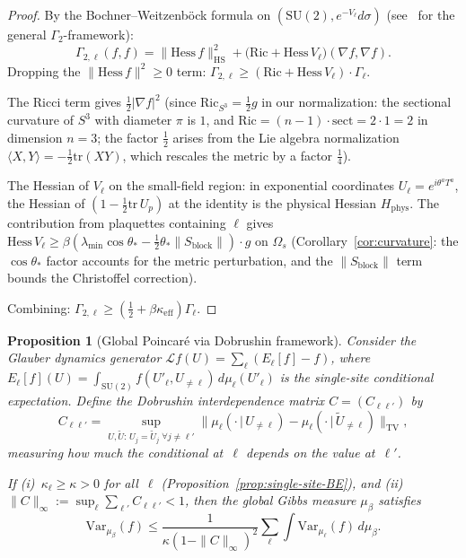 \documentclass[11pt]{article}
\newtheorem{proposition}[theorem]{Proposition}
\theoremstyle{definition}
\newcommand{\SU}{\mathrm{SU}}
\newcommand{\tr}{\mathrm{tr}}
\begin{document}
\begin{proof}
By the Bochner--Weitzenb\"ock formula on
$(\SU(2),e^{-V_\ell}d\sigma)$
(see~\cite{BakryEmery} for the general
$\Gamma_2$-framework):
\begin{equation}
\Gamma_{2,\ell}(f,f)
=\|\mathrm{Hess}\,f\|_{\mathrm{HS}}^2
+\bigl(\mathrm{Ric}+\mathrm{Hess}\,V_\ell\bigr)
(\nabla f,\nabla f).
\end{equation}
Dropping the $\|\mathrm{Hess}\,f\|^2\ge 0$ term:
$\Gamma_{2,\ell}\ge(\mathrm{Ric}+\mathrm{Hess}\,V_\ell)\cdot\Gamma_\ell$.

The Ricci term gives $\frac{1}{2}|\nabla f|^2$ (since
$\mathrm{Ric}_{S^3}=\frac{1}{2}g$ in our normalization: the
sectional curvature of $S^3$ with diameter $\pi$ is $1$, and
$\mathrm{Ric}=(n-1)\cdot\mathrm{sect}=2\cdot 1=2$ in dimension $n=3$;
the factor $\frac{1}{2}$ arises from the Lie algebra normalization
$\langle X,Y\rangle=-\frac{1}{2}\tr(XY)$, which rescales the metric
by a factor $\frac{1}{4}$).

The Hessian of $V_\ell$ on the small-field region: in exponential
coordinates $U_\ell=e^{i\theta^a T^a}$, the Hessian of
$(1-\frac{1}{2}\tr\,U_p)$ at the identity is the physical Hessian
$H_{\mathrm{phys}}$.  The contribution from plaquettes containing
$\ell$ gives
$\mathrm{Hess}\,V_\ell\ge\beta(\lambda_{\min}\cos\theta_*
-\frac{1}{2}\theta_*\|S_{\mathrm{block}}\|)\cdot g$
on $\Omega_s$
(Corollary~\ref{cor:curvature}: the $\cos\theta_*$ factor accounts
for the metric perturbation, and the $\|S_{\mathrm{block}}\|$ term
bounds the Christoffel correction).

Combining: $\Gamma_{2,\ell}\ge(\frac{1}{2}+\beta\kappa_{\mathrm{eff}})\Gamma_\ell$.
\end{proof}

\begin{proposition}[Global Poincar\'e via Dobrushin framework]%
\label{prop:global-poincare}
Consider the Glauber dynamics generator
$\mathcal{L}f(U)=\sum_\ell(E_\ell[f]-f)$,
where $E_\ell[f](U)=\int_{\SU(2)}f(U'_\ell,U_{\neq\ell})\,
d\mu_\ell(U'_\ell)$ is the single-site conditional expectation.
Define the \emph{Dobrushin interdependence matrix}
$C=(C_{\ell\ell'})$ by
\begin{equation}\label{eq:dobrushin}
C_{\ell\ell'}=\sup_{U,\tilde{U}:\,U_j=\tilde{U}_j\;\forall j\ne\ell'}
\|\mu_\ell(\cdot\,|\,U_{\neq\ell})
-\mu_\ell(\cdot\,|\,\tilde{U}_{\neq\ell})\|_{\mathrm{TV}},
\end{equation}
measuring how much the conditional at~$\ell$ depends on the
value at~$\ell'$.

If (i)~$\kappa_\ell\ge\kappa>0$ for all~$\ell$
(Proposition~\ref{prop:single-site-BE}),
and (ii)~$\|C\|_\infty:=\sup_\ell\sum_{\ell'}C_{\ell\ell'}<1$,
then the global Gibbs measure $\mu_\beta$ satisfies
\begin{equation}\label{eq:global-poincare}
\mathrm{Var}_{\mu_\beta}(f)
\le\frac{1}{\kappa(1-\|C\|_\infty)^2}
\sum_\ell\int\mathrm{Var}_{\mu_\ell}(f)\,d\mu_\beta.
\end{equation}
\end{proposition}
\end{document}
